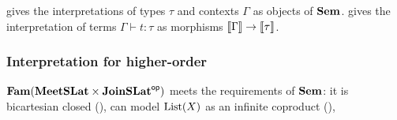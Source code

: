  gives the interpretations of types $\tau$ and contexts $\Gamma$ as objects of $\mathbf{Sem}$.
 gives the interpretation of terms $\Gamma \vdash t: \tau$ as morphisms $\llbracket \Gamma \rrbracket
\to \llbracket \tau \rrbracket$.

\subsubsection{Interpretation for higher-order \GPS}

$\mathbf{Fam}(\mathbf{MeetSLat} \times \mathbf{JoinSLat}^{\mathsf{op}})$ meets the requirements of $\mathbf{Sem}$: it is bicartesian closed
(), can model $\mathrm{List}(X)$ as an infinite coproduct
(), 
